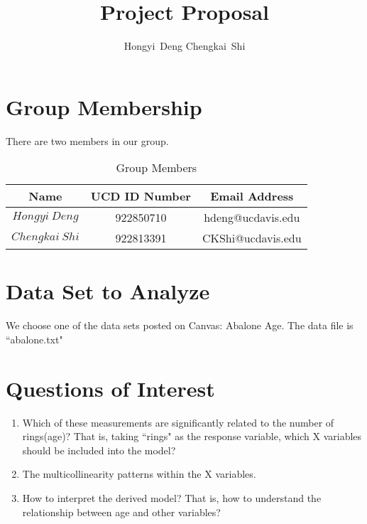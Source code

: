 \documentclass[12pt]{article}
\begin{document}
\title{\vspace{-2cm}Project Proposal}
\author{Hongyi\ Deng \quad Chengkai\ Shi}
\maketitle

\section{Group Membership}
There are two members in our group.
\begin{table}[H]
	\begin{center}
		\caption{Group Members}
		\begin{tabular}{c|c|c}
			\toprule
			\multicolumn{1}{m{3cm}}{\centering Name}
			&\multicolumn{1}{m{5cm}}{\centering UCD ID Number}
			&\multicolumn{1}{m{5cm}}{\centering Email Address}\\
			\midrule
			$Hongyi \ Deng$& 922850710 & hdeng@ucdavis.edu\\
			$Chengkai \ Shi$& 922813391 & CKShi@ucdavis.edu\\
			\bottomrule
		\end{tabular}
	\end{center}
\end{table}

 
  
\section{Data Set to Analyze}
We choose one of the data sets posted on Canvas: Abalone Age. The data file is ``abalone.txt"



\section{Questions of Interest}
\begin{enumerate}[\bf 1.]
	\item  Which of these measurements are significantly related to the number of rings(age)? That is, taking ``rings" as the response variable, which X variables should be included into the model?
	\item The multicollinearity patterns within the X variables.
	\item How to interpret the derived model? That is, how to understand the relationship between age and other variables? 
\end{enumerate}
\end{document}
